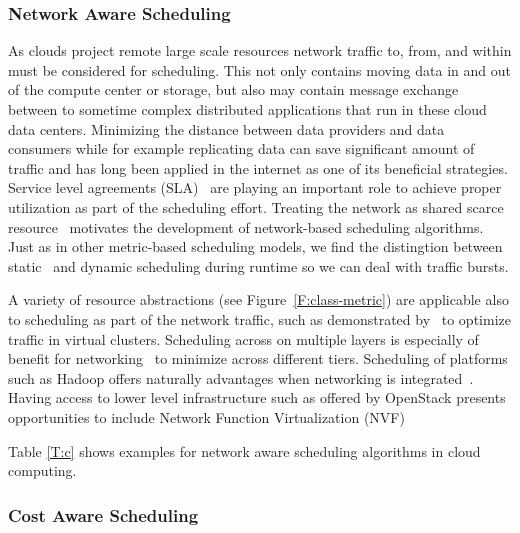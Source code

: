 \documentclass[final,5p,times,twocolumn]{elsarticle}
\begin{document}


\subsubsection{Network Aware Scheduling}\label{sec:network}




As clouds project remote large scale resources network traffic to,
from, and within must be considered for scheduling. This not only
contains moving data in and out of the compute center or storage, but
also may contain message exchange between to sometime complex
distributed applications that run in these cloud data
centers. Minimizing the distance between data providers and data
consumers while for example replicating data \cite{www-akamai} can save
significant amount of traffic and has long been applied in the
internet as one of its beneficial strategies. Service level agreements
(SLA)~\cite{breitgand2012improving} are playing an important role to
achieve proper utilization as part of the scheduling effort. Treating
the network as shared scarce resource~\cite{rampersaud2016sharing}
motivates the development of network-based scheduling algorithms.
Just as in other metric-based scheduling models, we find the
distingtion between static~\cite{biran2012stable} and dynamic
scheduling during runtime so we can deal with traffic bursts.

A variety of resource abstractions (see Figure~\ref{F:class-metric}) are
applicable also to scheduling as part of the network traffic, such as
demonstrated by~\cite{yu2017survivable} to optimize traffic in virtual
clusters.  Scheduling across on multiple layers is especially of
benefit for networking~\cite{bi2015sla} to minimize across different
tiers.  Scheduling of platforms such as Hadoop offers naturally
advantages when networking is integrated~\cite{kondikoppa2012network}.  Having access to lower level infrastructure
such as offered by OpenStack presents opportunities to include Network
Function Virtualization (NVF)~\cite{lucrezia2015introducing}

Table \ref{T:c} shows examples for network aware scheduling algorithms
in cloud computing.






\subsubsection{Cost Aware Scheduling}\label{sec:cost}
\end{document}
